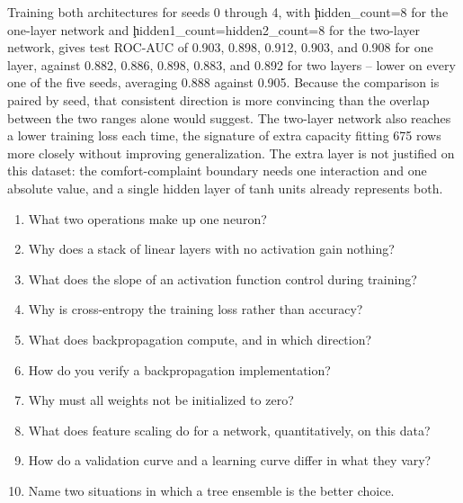 Training both architectures for seeds 0 through 4, with \c{hidden_count=8} for
the one-layer network and \c{hidden1_count=hidden2_count=8} for the two-layer
network, gives test ROC-AUC of 0.903, 0.898, 0.912, 0.903, and 0.908 for one
layer, against 0.882, 0.886, 0.898, 0.883, and 0.892 for two layers -- lower on
every one of the five seeds, averaging 0.888 against 0.905. Because the
comparison is paired by seed, that consistent direction is more convincing than
the overlap between the two ranges alone would suggest. The two-layer network
also reaches a lower training loss each time, the signature of extra capacity
fitting 675 rows more closely without improving generalization. The extra layer
is not justified on this dataset: the comfort-complaint boundary needs one
interaction and one absolute value, and a single hidden layer of tanh units
already represents both.


\begin{enumerate}
    \item What two operations make up one neuron?
    \item Why does a stack of linear layers with no activation gain nothing?
    \item What does the slope of an activation function control during training?
    \item Why is cross-entropy the training loss rather than accuracy?
    \item What does backpropagation compute, and in which direction?
    \item How do you verify a backpropagation implementation?
    \item Why must all weights not be initialized to zero?
    \item What does feature scaling do for a network, quantitatively, on this data?
    \item How do a validation curve and a learning curve differ in what they vary?
    \item Name two situations in which a tree ensemble is the better choice.
\end{enumerate}


